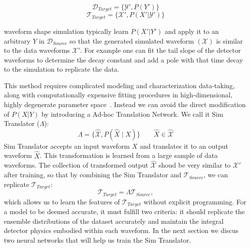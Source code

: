 \begin{equation}
\mathcal{D}_{Target}=\{\mathcal{Y}',P(Y')\}
\end{equation}
\begin{equation}
\mathcal{T}_{Target}=\{\mathcal{X}',P(X'|\mathcal{Y}')\}
\end{equation}

waveform shape simulation typically learn $P(X'|Y')$ and apply it to an arbitrary $Y$ in $\mathcal{D}_{Source}$ so that the generated simulated waveform $(\mathcal{X})$ is similar to the data waveforms $\mathcal{X}'$. For example one can fit the tail slope of the detector waveforms to determine the decay constant and add a pole with that time decay to the simulation to replicate the data. 

This method requires complicated modeling and characterization data-taking, along with computationally expensive fitting procedures in high-dimensional, highly degenerate parameter space~\cite{Ben_Thesis,Sam_Thesis}. Instead we can avoid the direct modification of  $P(X|Y)$ by introducing a Ad-hoc Translation Network. We call it Sim Translator ($\Lambda$):
\begin{equation}
\Lambda = \{\hat{\mathcal{X}}, P(\hat{X}\mid X)\}\qquad \hat{X}\in \hat{\mathcal{X}}
\label{eqn:Sim Translator}
\end{equation}
Sim Translator accepts an input waveform $X$ and translates it to an output waveform $\hat{X}$. This transformation is learned from a large sample of data waveforms. The collection of transformed output $\hat{\mathcal{X}}$ shoud be very similar to $\mathcal{X}'$ after training, so that by combining the Sim Translator and $\mathcal{T}_{Source}$, we can replicate $\mathcal{T}_{Target}$:
\begin{equation}
    \mathcal{T}_{Target}=\Lambda \mathcal{T}_{Source} ,
    \label{eqn:Sim Translator_task}
\end{equation}
which allows us to learn the features of $\mathcal{T}_{Target}$ without explicit programming. For a model to be deemed accurate, it must fulfill two criteria: it should replicate the ensemble distributions of the dataset accurately and maintain the integral detector physics embodied within each waveform. In the next section we discus two neural networks that will help us train the Sim Translator.



